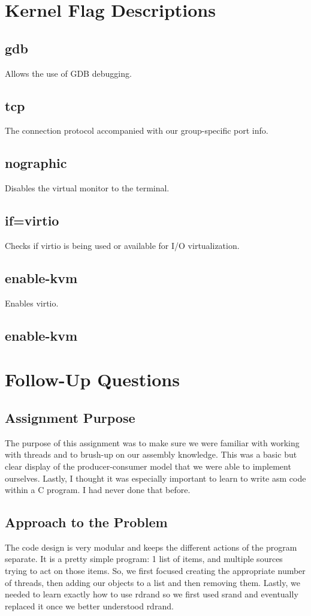 \documentclass[10pt,draftclsnofoot,onecolumn]{IEEEtran}
\begin{document}
{\section{Kernel Flag Descriptions}
	\subsection{gdb}
	Allows the use of GDB debugging.
	\subsection{tcp}
	The connection protocol accompanied with our group-specific port info.
	\subsection{nographic}
	Disables the virtual monitor to the terminal.
	\subsection{if=virtio}
	Checks if virtio is being used or available for I/O virtualization.
	\subsection{enable-kvm}
	Enables virtio.
	\subsection{enable-kvm}
		
		
  \vspace{5mm}
\section{Follow-Up Questions}
\subsection{Assignment Purpose}
The purpose of this assignment was to make sure we were familiar with working with threads and to brush-up on our assembly knowledge. This was a basic but clear display of the producer-consumer model that we were able to implement ourselves. Lastly, I thought it was especially important to learn to write asm code within a C program. I had never done that before.
\subsection{Approach to the Problem}
The code design is very modular and keeps the different actions of the program separate. It is a pretty simple program: 1 list of items, and multiple sources trying to act on those items. So, we first focused creating the appropriate number of threads, then adding our objects to a list and then removing them. Lastly, we needed to learn exactly how to use rdrand so we first used srand and eventually replaced it once we better understood rdrand. 
}
\end{document}
